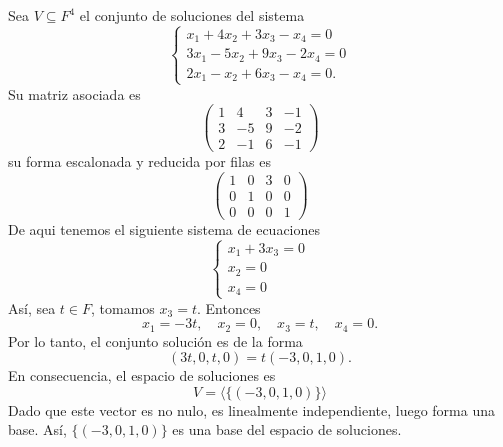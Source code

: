 \documentclass[12pt,a4paper]{article}
\begin{document}
    \begin{solucion}
        Sea $V\subseteq F^{4}$ el conjunto de soluciones del sistema
        \begin{equation*}
            \begin{cases}
                x_{1}+4x_{2}+3x_{3}-x_{4}=0\\
                3x_{1}-5x_{2}+9x_{3}-2x_{4}=0\\
                2x_{1}-x_{2}+6x_{3}-x_{4}=0.
            \end{cases}
        \end{equation*}
        Su matriz asociada es
        \begin{equation*}
            \begin{pmatrix}
                1 & 4 & 3 & -1\\
                3 & -5 & 9 & -2\\
                2 & -1 & 6 & -1
            \end{pmatrix}
        \end{equation*}
        su forma escalonada y reducida por filas es
        \begin{equation*}
            \begin{pmatrix}
                1 & 0 & 3 & 0\\
                0 & 1 & 0 & 0\\
                0 & 0 & 0 & 1
            \end{pmatrix}
        \end{equation*}
        De aqui tenemos el siguiente sistema de ecuaciones
        \begin{equation*}
            \begin{cases}
                x_{1}+3x_{3}=0\\
                x_{2}=0\\
                x_{4}=0
            \end{cases}
        \end{equation*}
        Así, sea $t\in F$, tomamos $x_{3}=t$. Entonces
        \begin{equation*}
            x_{1}=-3t,\quad x_{2}=0,\quad x_{3}=t,\quad x_{4}=0.
        \end{equation*}
        Por lo tanto, el conjunto solución es de la forma
        \begin{equation*}
            (3t,0,t,0)=t(-3,0,1,0).
        \end{equation*}
        En consecuencia, el espacio de soluciones es
        \begin{equation*}
            V=\langle\{(-3,0,1,0)\}\rangle
        \end{equation*}
        Dado que este vector es no nulo, es linealmente independiente, luego forma una base.
        Así, $\{(-3,0,1,0)\}$ es una base del espacio de soluciones.
    \end{solucion}
\end{document}
